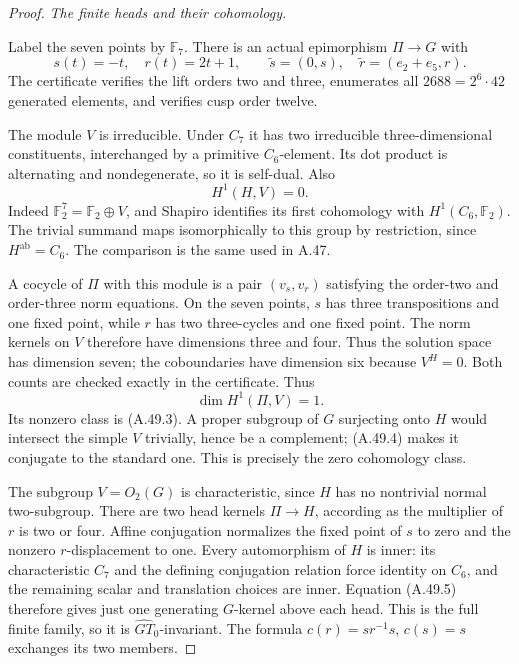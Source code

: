 \begin{proof}
\emph{The finite heads and their cohomology.}\par
Label the seven points by \(\mathbb F_7\). There
is an actual epimorphism \(\Pi\to G\) with
\[
 s(t)=-t,\quad r(t)=2t+1,
 \qquad \widetilde s=(0,s),
 \quad \widetilde r=(e_2+e_5,r).
 \tag{A.49.3}
\]
The certificate 
verifies the lift orders two and three, enumerates
all \(2688=2^6\cdot42\) generated elements,
and verifies cusp order twelve.

The module \(V\) is irreducible. Under \(C_7\)
it has two irreducible three-dimensional
constituents, interchanged by a primitive
\(C_6\)-element. Its dot product is alternating
and nondegenerate, so it is self-dual. Also
\[
                         H^1(H,V)=0.
 \tag{A.49.4}
\]
Indeed \(\mathbb F_2^7=\mathbb F_2\oplus V\),
and Shapiro identifies its first cohomology
with \(H^1(C_6,\mathbb F_2)\). The trivial
summand maps isomorphically to this group
by restriction, since \(H^{\mathrm{ab}}=C_6\).
The comparison is the same
\citet[Proposition~3.3]{ABrown2010} used in A.47.

A cocycle of \(\Pi\) with this module is a pair
\((v_s,v_r)\) satisfying the order-two and
order-three norm equations. On the seven points, \(s\) has three transpositions
and one fixed point, while \(r\) has two three-cycles
and one fixed point. The norm kernels on \(V\)
therefore have dimensions three and four. Thus
the solution space has dimension seven; the
coboundaries have dimension six because \(V^H=0\). Both counts are checked exactly
in the certificate. Thus
\[
                         \dim H^1(\Pi,V)=1.
 \tag{A.49.5}
\]
Its nonzero class is (A.49.3). A proper subgroup
of \(G\) surjecting onto \(H\) would intersect
the simple \(V\) trivially, hence be a complement;
(A.49.4) makes it conjugate to the standard one.
This is precisely the zero cohomology class.

The subgroup \(V=O_2(G)\) is characteristic,
since \(H\) has no nontrivial normal two-subgroup.
There are two head kernels \(\Pi\to H\),
according as the multiplier of \(r\) is two
or four. Affine conjugation normalizes the
fixed point of \(s\) to zero and the nonzero
\(r\)-displacement to one. Every automorphism
of \(H\) is inner: its characteristic \(C_7\)
and the defining conjugation relation force
identity on \(C_6\), and the remaining scalar
and translation choices are inner. Equation
(A.49.5) therefore gives just one generating
\(G\)-kernel above each head. This is the full
finite family, so it is \(\widehat{GT}_0\)-invariant.
The formula \(c(r)=sr^{-1}s\), \(c(s)=s\)
exchanges its two members.


\end{proof}
